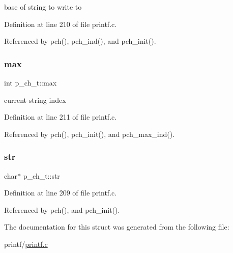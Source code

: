 base of string to write to 



Definition at line 210 of file printf.\+c.



Referenced by pch(), pch\+\_\+ind(), and pch\+\_\+init().

\mbox{\label{structp__ch__t_a0dee9f28e498d427e53051b7e1846d34}} 
\subsubsection{\texorpdfstring{max}{max}}
{\footnotesize\ttfamily int p\+\_\+ch\+\_\+t\+::max}



current string index 



Definition at line 211 of file printf.\+c.



Referenced by pch(), pch\+\_\+init(), and pch\+\_\+max\+\_\+ind().

\mbox{\label{structp__ch__t_aa3c8616342a2717bc714bf1b6d00516f}} 
\subsubsection{\texorpdfstring{str}{str}}
{\footnotesize\ttfamily char$\ast$ p\+\_\+ch\+\_\+t\+::str}



Definition at line 209 of file printf.\+c.



Referenced by pch(), and pch\+\_\+init().



The documentation for this struct was generated from the following file\+:\begin{DoxyCompactItemize}
\item 
printf/\hyperlink{printf_8c}{printf.\+c}\end{DoxyCompactItemize}
